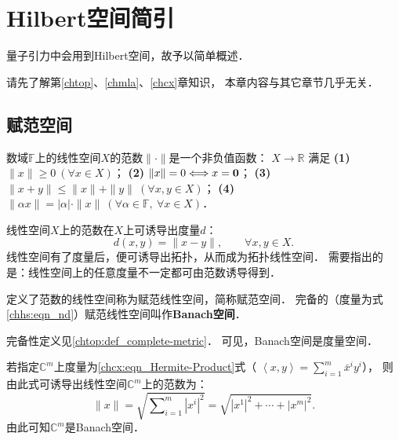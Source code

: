 

\chapter{Hilbert空间简引} \label{chhs}

量子引力中会用到Hilbert空间，故予以简单概述．

请先了解第\ref{chtop}、\ref{chmla}、\ref{chcx}章知识，
本章内容与其它章节几乎无关．


   
  


\section{赋范空间}\label{chhs:sec_norm}

\begin{definition}
	数域$\mathbb{F}$上的线性空间$X$的{\heiti 范数}$\|\cdot\|$是一个非负值函数：
	$X \rightarrow \mathbb{R}$ 满足
	{\bfseries (1)} $\|x\| \geqslant 0 \ (\forall x \in {X})$；
	{\bfseries (2)} $\|x\|=0 \Longleftrightarrow x={\bf{0}}$；
	{\bfseries (3)} $\|x+y\| \leqslant\|x\|+\|y\| \  (\forall x, y \in {X})$；
	{\bfseries (4)} $\|\alpha x\|=|\alpha| \cdot\|x\| \  (\forall \alpha \in \mathbb{F},\ \forall x \in {X})$．
\end{definition}
	
线性空间$X$上的范数在$X$上可诱导出度量$d$：
\begin{equation}\label{chhs:eqn_nd}
	d(x, y)= \|x-y\|, \qquad  \forall x, y \in X .
\end{equation}
线性空间有了度量后，便可诱导出拓扑，从而成为{\heiti 拓扑线性空间}．
需要指出的是：线性空间上的任意度量不一定都可由范数诱导得到．

\begin{definition}	
	定义了范数的线性空间称为{\heiti 赋范线性空间}，简称{\heiti 赋范空间}．
	完备的（度量为式\eqref{chhs:eqn_nd}）赋范线性空间叫作{\heiti\bfseries Banach空间}．
\end{definition}

完备性定义见\ref{chtop:def_complete-metric}．
可见，Banach空间是度量空间．

\begin{example}\label{chhs:exam_NCm}
	若指定$\mathbb{C}^m$上度量为\eqref{chcx:eqn_Hermite-Product}式（
	$\left<x,y\right>= \sum\nolimits_{i=1}^{m}\bar{x}^i y^i$），
	则由此式可诱导出线性空间$\mathbb{C}^m$上的范数为：
	\begin{equation}\label{chhs:eqn_NCm}
		\| x \| = \sqrt{\sum\nolimits_{i=1}^{m}  |x^i|^2 }
		= \sqrt{|x^1|^2 +\cdots +|x^m|^2 } .
	\end{equation}
	由此可知$\mathbb{C}^m$是Banach空间． 
\end{example}

